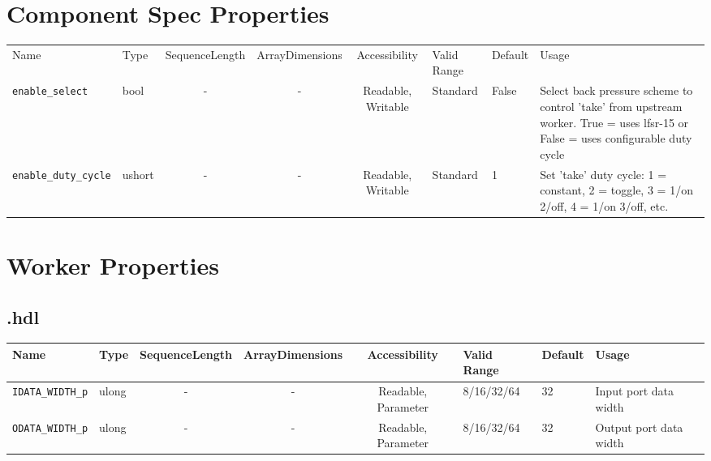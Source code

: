 \begin{landscape}
	\section*{Component Spec Properties}
	\begin{scriptsize}
		\begin{tabular}{|p{2cm}|p{1.5cm}|c|c|c|p{1.5cm}|p{1cm}|p{7cm}|}
			\hline
			\rowcolor{blue}
			Name                 & Type   & SequenceLength & ArrayDimensions & Accessibility       & Valid Range & Default & Usage                                                 \\
			\verb+enable_select+     & bool & -              & -               & Readable, Writable  & Standard    & False       & Select back pressure scheme to control 'take' from upstream worker. True = uses lfsr-15 or False = uses configurable duty cycle \\
			\hline
			\verb+enable_duty_cycle+   & ushort & -              & -               & Readable, Writable  & Standard    & 1    & Set 'take' duty cycle: 1 = constant, 2 = toggle, 3 = 1/on 2/off, 4 = 1/on 3/off, etc. \\
			\hline
		\end{tabular}
	\end{scriptsize}

	\section*{Worker Properties}
	\subsection*{\comp.hdl}
	\begin{scriptsize}
		\begin{tabular}{|p{2cm}|p{1.5cm}|c|c|c|p{1.5cm}|p{1cm}|p{7cm}|}
			\hline
			\rowcolor{blue}
			Name                      & Type  & SequenceLength & ArrayDimensions & Accessibility       & Valid Range & Default & Usage                                      \\
			\hline
			\verb+IDATA_WIDTH_p+ & ulong  & -              & -               & Readable, Parameter & 8/16/32/64  & 32      & Input port data width                                 \\
			\hline
			\verb+ODATA_WIDTH_p+ & ulong  & -              & -               & Readable, Parameter & 8/16/32/64  & 32      & Output port data width                                \\
			\hline
		\end{tabular}
	\end{scriptsize}


\end{landscape}
